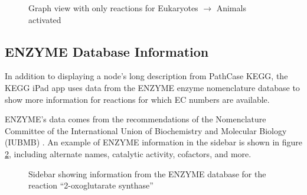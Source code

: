 \begin{figure}[hbt]
    \caption{\label{fig:kegg_screenshot_animals_only_graph} Graph view with only
    reactions for Eukaryotes $\rightarrow$ Animals activated}
\end{figure}

\subsection{ENZYME Database Information}


In addition to displaying a node's long description from PathCase KEGG, the KEGG
iPad app uses data from the ENZYME enzyme nomenclature database to show more
information for reactions for which EC numbers are available.

ENZYME's data comes from the recommendations of the Nomenclature Committee of
the International Union of Biochemistry and Molecular Biology (IUBMB)
\cite{enzyme-database}. An example of ENZYME information in the sidebar is shown
in figure \ref{fig:kegg_screenshot_selection_info}, including alternate names,
catalytic activity, cofactors, and more.

\begin{figure}[hbt]
    \caption{\label{fig:kegg_screenshot_selection_info} Sidebar showing
    information from the ENZYME database for the reaction ``2-oxoglutarate
    synthase''}
\end{figure}
